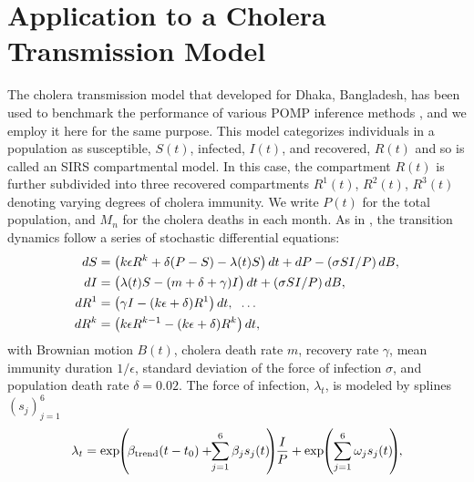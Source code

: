 \documentclass[numsec,webpdf,modern,medium,namedate]{oup-authoring-template}
\newcommand\arxiv[2]{#2} %
\theoremstyle{thmstyleone}%
\theoremstyle{thmstyletwo}%
\theoremstyle{thmstylethree}%
\begin{document}
\arxiv{}{\vspace*{-2mm}}
\section{Application to a Cholera Transmission Model}
\label{sec:cholera}

The cholera transmission model that \cite{king08} developed for Dhaka, Bangladesh, has been used to benchmark the performance of various POMP inference methods \citep{ionides15, fasiolo16, wycoff24}, and we employ it here for the same purpose.
This model categorizes individuals in a population as susceptible, $S(t)$, infected, $I(t)$, and recovered, $R(t)$ and so is called an SIRS compartmental model.
In this case, the compartment $R(t)$ is further subdivided into 
three recovered compartments $R^1(t)$, $R^2(t)$, $R^3(t)$ denoting varying degrees of cholera immunity.
We write $P(t)$ for the total population, and $M_n$ for the cholera deaths in each month.
As in \citep{king08, ionides15}, the transition dynamics follow a series of stochastic differential equations:
\vspace*{-1mm}
\begin{align*}
    dS&=\big(k \epsilon R^k+\delta(P-S)-\lambda(t) S\big)\, dt+d P-({\sigma S I}/{P})\, dB, \\
    dI&=\big(\lambda(t) S-(m+\delta+\gamma) I\big)\, dt+({\sigma S I}/{P})\, dB, \\
    dR^1&=\big(\gamma I-(k \epsilon+\delta) R^1\big)\, dt, \hspace{2mm} \dots \\
    dR^k&=\big(k \epsilon R^{k-1} -(k \epsilon+\delta) R^k\big)\, dt,
    \vspace*{-2mm}
\end{align*}
with Brownian motion $B(t)$, cholera death rate $m$, recovery rate $\gamma$, mean immunity duration $1/\epsilon$, standard deviation of the force of infection $\sigma$, and population death rate $\delta=0.02$. The force of infection, $\lambda_t$, is modeled by splines $(s_j)_{j=1}^6$
\vspace*{-2mm}
\begin{equation*}    \lambda_t=\exp\hspace{-1mm}\left(\hspace{-.5mm}\beta_{\text{trend}}(t-t_0)+\hspace{-1mm}\sum_{j=1}^{6} \beta_j s_j(t)\hspace{-1mm}\right)\hspace{-1mm}\frac{I}{P} + \exp\hspace{-1mm} \left(\sum_{j=1}^{6} \omega_j s_j(t)\hspace{-1mm}\right)\hspace{-1mm},
    \vspace*{-2mm}
\end{equation*}
\end{document}
